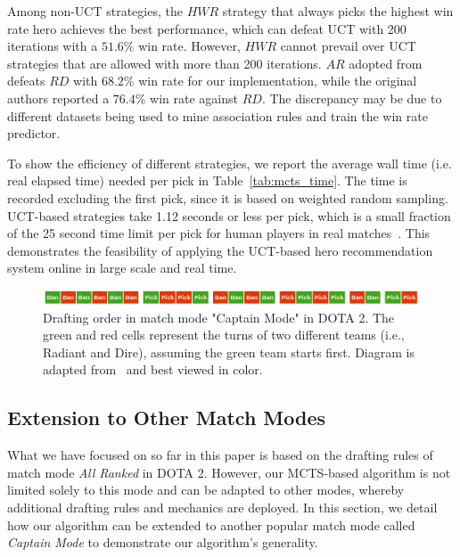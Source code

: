 Among non-UCT strategies, the $HWR$ strategy that always picks the highest win rate hero achieves the best performance, which can defeat UCT with 200 iterations with a $51.6\%$ win rate. However, $HWR$ cannot prevail over UCT strategies that are allowed with more than 200 iterations. $AR$ adopted from~\cite{hanke2017reco} defeats $RD$ with $68.2\%$ win rate for our implementation, while the original authors reported a $76.4\%$ win rate against $RD$. The discrepancy may be due to different datasets being used to mine association rules and train the win rate predictor.

To show the efficiency of different strategies, we report the average wall time (i.e. real elapsed time) needed per pick in Table~\ref{tab:mcts_time}. The time is recorded excluding the first pick, since it is based on weighted random sampling. UCT-based strategies take 1.12 seconds or less per pick, which is a small fraction of the 25 second time limit per pick for human players in real matches~\cite{dotapickorder}. This demonstrates the feasibility of applying the UCT-based hero recommendation system online in large scale and real time.



\begin{figure}
\centering
\includegraphics[width=1\textwidth]{Figures/pickorder_captain_mode.png}
\caption{Drafting order in match mode "Captain Mode" in DOTA 2. The green and red cells represent the turns of two different teams (i.e., Radiant and Dire), assuming the green team starts first. Diagram is adapted from~\cite{dotapickorder} and best viewed in color.}
\label{fig:pickorder_captain_mode}
\end{figure}

\subsection{Extension to Other Match Modes}\label{sec:extension}
What we have focused on so far in this paper is based on the drafting rules of match mode \textit{All Ranked} in DOTA 2. However, our MCTS-based algorithm is not limited solely to this mode and can be adapted to other modes, whereby additional drafting rules and mechanics are deployed. In this section, we detail how our algorithm can be extended to another popular match mode called \textit{Captain Mode} to demonstrate our algorithm's generality. 

